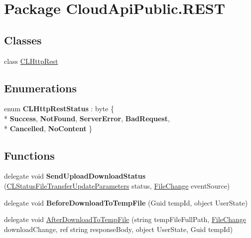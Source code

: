\hypertarget{namespace_cloud_api_public_1_1_r_e_s_t}{\section{Package Cloud\-Api\-Public.\-R\-E\-S\-T}
\label{namespace_cloud_api_public_1_1_r_e_s_t}
}
\subsection*{Classes}
\begin{DoxyCompactItemize}
\item 
class \hyperlink{class_cloud_api_public_1_1_r_e_s_t_1_1_c_l_http_rest}{C\-L\-Http\-Rest}
\end{DoxyCompactItemize}
\subsection*{Enumerations}
\begin{DoxyCompactItemize}
\item 
enum {\bfseries C\-L\-Http\-Rest\-Status} \-: byte \{ \\*
{\bfseries Success}, 
{\bfseries Not\-Found}, 
{\bfseries Server\-Error}, 
{\bfseries Bad\-Request}, 
\\*
{\bfseries Cancelled}, 
{\bfseries No\-Content}
 \}
\end{DoxyCompactItemize}
\subsection*{Functions}
\begin{DoxyCompactItemize}
\item 
\hypertarget{namespace_cloud_api_public_1_1_r_e_s_t_a8d947c611c43ec82d70d9cdbcd34b6ce}{delegate void {\bfseries Send\-Upload\-Download\-Status} (\hyperlink{struct_cloud_api_public_1_1_model_1_1_c_l_status_file_transfer_update_parameters}{C\-L\-Status\-File\-Transfer\-Update\-Parameters} status, \hyperlink{class_cloud_api_public_1_1_model_1_1_file_change}{File\-Change} event\-Source)}\label{namespace_cloud_api_public_1_1_r_e_s_t_a8d947c611c43ec82d70d9cdbcd34b6ce}

\item 
\hypertarget{namespace_cloud_api_public_1_1_r_e_s_t_a556d9270cf75b4405d87862034060fac}{delegate void {\bfseries Before\-Download\-To\-Temp\-File} (Guid temp\-Id, object User\-State)}\label{namespace_cloud_api_public_1_1_r_e_s_t_a556d9270cf75b4405d87862034060fac}

\item 
delegate void \hyperlink{namespace_cloud_api_public_1_1_r_e_s_t_add2499738a8a21303b4181e302bb26d2}{After\-Download\-To\-Temp\-File} (string temp\-File\-Full\-Path, \hyperlink{class_cloud_api_public_1_1_model_1_1_file_change}{File\-Change} download\-Change, ref string response\-Body, object User\-State, Guid temp\-Id)
\begin{DoxyCompactList}\small\item\em \end{DoxyCompactList}\end{DoxyCompactItemize}


